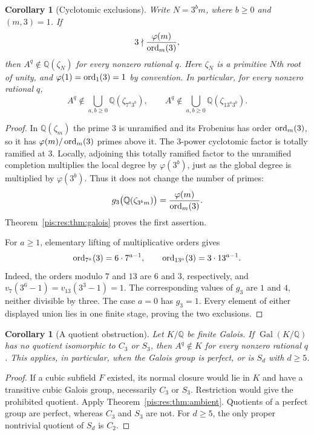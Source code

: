 \documentclass[11pt,a4paper]{article}
\newtheorem{corollary}[theorem]{Corollary}
\theoremstyle{definition}\newtheorem{definition}[theorem]{Definition}
\theoremstyle{remark}\newtheorem{remark}[theorem]{Remark}
\newcommand{\Q}{\mathbb Q}\newcommand{\R}{\mathbb R}
\begin{document}
\begin{corollary}[Cyclotomic exclusions]
\label{pis:res:cor:cyclotomic}
Write $N=3^b m$, where $b\ge0$ and $(m,3)=1$. If
\[
 3\nmid\frac{\varphi(m)}{\operatorname{ord}_m(3)},
\]
then $A^q\notin\Q(\zeta_N)$ for every nonzero rational $q$.
Here $\zeta_N$ is a primitive $N$th root of unity, and
$\varphi(1)=\operatorname{ord}_1(3)=1$ by convention. In particular, for every
nonzero rational $q$,
\[
 A^q\notin\bigcup_{a,b\ge0}\Q(\zeta_{7^a3^b}),
 \qquad
 A^q\notin\bigcup_{a,b\ge0}\Q(\zeta_{13^a3^b}).
\]
\end{corollary}
\begin{proof}
In $\Q(\zeta_m)$ the prime $3$ is unramified and its Frobenius has
order $\operatorname{ord}_m(3)$, so it has
$\varphi(m)/\operatorname{ord}_m(3)$ primes above it. The $3$-power cyclotomic
factor is totally ramified at $3$. Locally, adjoining this totally
ramified factor to the unramified completion multiplies the local
degree by $\varphi(3^b)$, just as the global degree is multiplied
by $\varphi(3^b)$. Thus it does not change the number of primes:
\[
 g_3\bigl(\Q(\zeta_{3^b m})\bigr)
 =\frac{\varphi(m)}{\ord_m(3)}.
\]
Theorem~\ref{pis:res:thm:galois} proves the first assertion.

For $a\ge1$, elementary lifting of multiplicative orders gives
\[
 \operatorname{ord}_{7^a}(3)=6\cdot7^{a-1},\qquad
 \operatorname{ord}_{13^a}(3)=3\cdot13^{a-1}.
\]
Indeed, the orders modulo $7$ and $13$ are $6$ and $3$, respectively,
and $v_7(3^6-1)=v_{13}(3^3-1)=1$. The corresponding values of
$g_3$ are $1$ and $4$, neither divisible by three. The case $a=0$
has $g_3=1$. Every element of either displayed union lies in one
finite stage, proving the two exclusions.
\end{proof}

\begin{corollary}[A quotient obstruction]
\label{pis:res:cor:quotient}
Let $K/\Q$ be finite Galois. If
$\operatorname{Gal}(K/\Q)$ has no quotient isomorphic to $C_3$ or
$S_3$, then $A^q\notin K$ for every nonzero rational $q$.
This applies, in particular, when the Galois group is perfect, or
is $S_d$ with $d\ge5$.
\end{corollary}
\begin{proof}
If a cubic subfield $F$ existed, its normal closure would lie in
$K$ and have a transitive cubic Galois group, necessarily $C_3$ or
$S_3$. Restriction would give the prohibited quotient. Apply
Theorem~\ref{pis:res:thm:ambient}. Quotients of a perfect group are
perfect, whereas $C_3$ and $S_3$ are not. For $d\ge5$, the only
proper nontrivial quotient of $S_d$ is $C_2$.
\end{proof}
\end{document}
